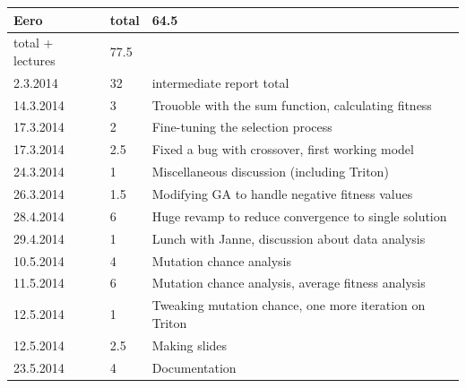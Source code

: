 \documentclass[twoside]{article}
\begin{document}
\begin{tabular}{|l|l|l|}
\hline
	\textbf{Eero} & \textbf{total} & \textbf{64.5} \\ \hline
	total + lectures & 77.5 & \  \\ \hline
	2.3.2014 & 32 & intermediate report total \\ \hline
	14.3.2014 & 3 & Trouoble with the sum function, calculating fitness \\ \hline
	17.3.2014 & 2 & Fine-tuning the selection process \\ \hline
	17.3.2014 & 2.5 & Fixed a bug with crossover, first working model \\ \hline
	24.3.2014 & 1 & Miscellaneous discussion (including Triton) \\ \hline
	26.3.2014 & 1.5 & Modifying GA to handle negative fitness values \\ \hline
	28.4.2014 & 6 & Huge revamp to reduce convergence to single solution \\ \hline
	29.4.2014 & 1 & Lunch with Janne, discussion about data analysis \\ \hline
	10.5.2014 & 4 & Mutation chance analysis \\ \hline
	11.5.2014 & 6 & Mutation chance analysis, average fitness analysis \\ \hline
	12.5.2014 & 1 & Tweaking mutation chance, one more iteration on Triton \\ \hline
	12.5.2014 & 2.5 & Making slides \\ \hline
	23.5.2014 & 4 & Documentation \\ \hline
\end{tabular}
\end{document}
